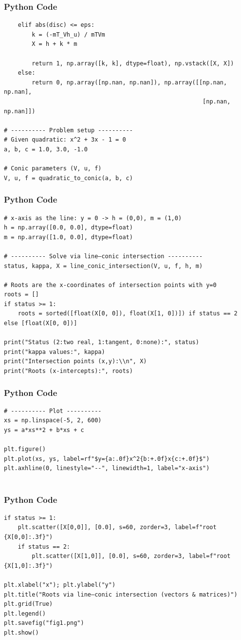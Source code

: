 \documentclass{beamer}
\numberwithin{equation}{section}
\begin{document}
\begin{frame}[fragile]
    \frametitle{Python Code}
    \begin{lstlisting}
    elif abs(disc) <= eps:
        k = (-mT_Vh_u) / mTVm
        X = h + k * m
        
        return 1, np.array([k, k], dtype=float), np.vstack([X, X])
    else:
        return 0, np.array([np.nan, np.nan]), np.array([[np.nan, np.nan],
                                                         [np.nan, np.nan]])

# ---------- Problem setup ----------
# Given quadratic: x^2 + 3x - 1 = 0
a, b, c = 1.0, 3.0, -1.0

# Conic parameters (V, u, f)
V, u, f = quadratic_to_conic(a, b, c)

\end{lstlisting}
\end{frame}
\begin{frame}[fragile]
    \frametitle{Python Code}
    \begin{lstlisting}
# x-axis as the line: y = 0 -> h = (0,0), m = (1,0)
h = np.array([0.0, 0.0], dtype=float)
m = np.array([1.0, 0.0], dtype=float)

# ---------- Solve via line–conic intersection ----------
status, kappa, X = line_conic_intersection(V, u, f, h, m)

# Roots are the x-coordinates of intersection points with y=0
roots = []
if status >= 1:
    roots = sorted([float(X[0, 0]), float(X[1, 0])]) if status == 2 else [float(X[0, 0])]

print("Status (2:two real, 1:tangent, 0:none):", status)
print("kappa values:", kappa)
print("Intersection points (x,y):\\n", X)
print("Roots (x-intercepts):", roots)

\end{lstlisting}
\end{frame}
\begin{frame}[fragile]
    \frametitle{Python Code}
    \begin{lstlisting}
# ---------- Plot ----------
xs = np.linspace(-5, 2, 600)
ys = a*xs**2 + b*xs + c

plt.figure()
plt.plot(xs, ys, label=rf"$y={a:.0f}x^2{b:+.0f}x{c:+.0f}$")
plt.axhline(0, linestyle="--", linewidth=1, label="x-axis")


\end{lstlisting}
\end{frame}
\begin{frame}[fragile]
    \frametitle{Python Code}
    \begin{lstlisting}
if status >= 1:
    plt.scatter([X[0,0]], [0.0], s=60, zorder=3, label=f"root {X[0,0]:.3f}")
    if status == 2:
        plt.scatter([X[1,0]], [0.0], s=60, zorder=3, label=f"root {X[1,0]:.3f}")

plt.xlabel("x"); plt.ylabel("y")
plt.title("Roots via line–conic intersection (vectors & matrices)")
plt.grid(True)
plt.legend()
plt.savefig("fig1.png")
plt.show()
\end{lstlisting}
\end{frame}
\end{document}
